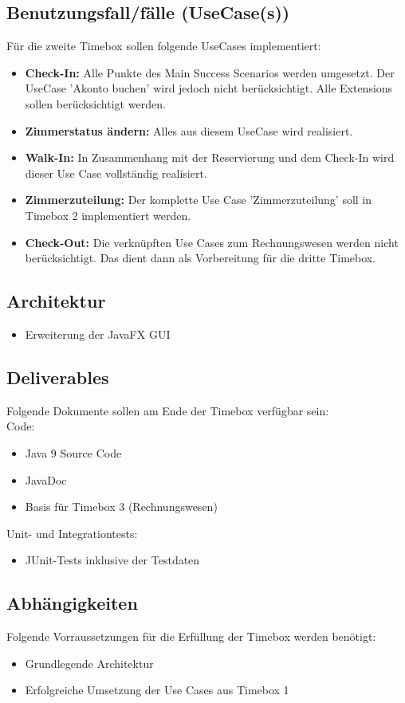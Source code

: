 \documentclass[../Pflichtenheft.tex]{subfiles}
\begin{document}
    \subsection{Benutzungsfall/fälle (UseCase(s)) }
    Für die zweite Timebox sollen folgende UseCases implementiert:
    \begin{itemize}
        \item \textbf{Check-In:} Alle Punkte des Main Success Scenarios werden umgesetzt. Der UseCase 'Akonto buchen' wird jedoch nicht berücksichtigt.
        Alle Extensions sollen berücksichtigt werden.
        \item \textbf{Zimmerstatus ändern: } Alles aus diesem UseCase wird realisiert.
        \item \textbf{Walk-In: } In Zusammenhang mit der Reservierung und dem Check-In wird dieser Use Case vollständig realisiert.
        \item \textbf{Zimmerzuteilung: } Der komplette Use Case 'Zimmerzuteilung' soll in Timebox 2 implementiert werden.
        \item \textbf{Check-Out:} Die verknüpften Use Cases zum Rechnungswesen werden nicht berücksichtigt. Das dient dann als Vorbereitung für die dritte Timebox.
    \end{itemize}
    \subsection{Architektur}
    \begin{itemize}
        \item Erweiterung der JavaFX GUI
    \end{itemize}
    \subsection{Deliverables}
    Folgende Dokumente sollen am Ende der Timebox verfügbar sein: \\
    Code:
    \begin{itemize}
        \item Java 9 Source Code
        \item JavaDoc
        \item Basis für Timebox 3 (Rechnungswesen)
    \end{itemize}
    Unit- und Integrationtests:
    \begin{itemize}
        \item JUnit-Tests inklusive der Testdaten
    \end{itemize}
    \subsection{Abhängigkeiten}
    Folgende Vorraussetzungen für die Erfüllung der Timebox werden benötigt:
    \begin{itemize}
        \item Grundlegende Architektur
        \item Erfolgreiche Umsetzung der Use Cases aus Timebox 1
    \end{itemize}
\end{document}
